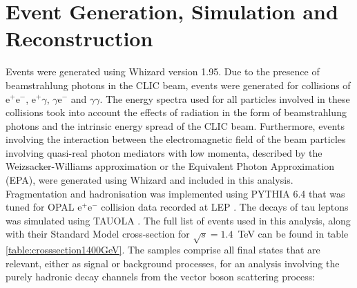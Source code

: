 \section{Event Generation, Simulation and Reconstruction}
\label{sec:eventgenerationandbackgrounds}
Events were generated using Whizard \cite{0708.4233, hep-ph/0102195} version 1.95.  Due to the presence of beamstrahlung photons in the CLIC beam, events were generated for collisions of $\text{e}^{+}\text{e}^{-}$, $\text{e}^{+}\gamma$, $\gamma\text{e}^{-}$ and $\gamma\gamma$.  The energy spectra used for all particles involved in these collisions took into account the effects of radiation in the form of beamstrahlung photons and the intrinsic energy spread of the CLIC beam.  Furthermore, events involving the interaction between the electromagnetic field of the beam particles involving quasi-real photon mediators with low momenta, described by the Weizsacker-Williams approximation or the Equivalent Photon Approximation (EPA), were generated using Whizard and included in this analysis.  Fragmentation and hadronisation was implemented using PYTHIA 6.4 \cite{Sjostrand:2006za} that was tuned for OPAL $\text{e}^{+}\text{e}^{-}$ collision data recorded at LEP \cite{Alexander:1995bk}.  The decays of tau leptons was simulated using TAUOLA \cite{Was:2000st}.  The full list of events used in this analysis, along with their Standard Model cross-section for $\sqrt{s}=1.4$~TeV can be found in table \ref{table:crosssection1400GeV}.  The samples comprise all final states that are relevant, either as signal or background processes, for an analysis involving the purely hadronic decay channels from the vector boson scattering process:

